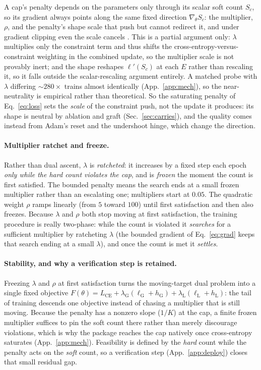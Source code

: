 \documentclass[10pt]{article}
\begin{document}
A cap's penalty depends on the parameters only through its scalar soft count
$S_c$, so its gradient always points along the same fixed direction
$\nabla_\theta S_c$: the multiplier, $\rho$, and the penalty's shape scale
that push but cannot redirect it, and under gradient clipping even the scale
cancels \citep{pascanu2013difficulty}. This is a partial argument only:
$\lambda$ multiplies only the constraint term and thus shifts the
cross-entropy-versus-constraint weighting in the combined update, so the
multiplier scale is not provably inert; and the shape reshapes $\ell'(S_c)$
at each $E$ rather than rescaling it, so it falls outside the scalar-rescaling
argument entirely. A matched probe with $\lambda$ differing ${\sim}280\times$
trains almost identically (App.~\ref{app:mech}), so the near-neutrality is
empirical rather than theoretical. So the saturating penalty of
Eq.~\eqref{eq:loss} sets the \emph{scale} of the constraint push, not the
update it produces: its shape is neutral by ablation and graft
(Sec.~\ref{sec:carries}), and the quality comes instead from Adam's reset
and the undershoot hinge, which change the direction.

\paragraph{Multiplier ratchet and freeze.}
Rather than dual ascent, $\lambda$ is \emph{ratcheted}: it increases by a
fixed step each epoch \emph{only while the hard count violates the cap}, and
is \emph{frozen} the moment the count is first satisfied. The bounded
penalty means the search ends at a small frozen multiplier rather than an
escalating one; multipliers start at $0.05$. The quadratic weight $\rho$
ramps linearly (from $5$ toward $100$) until first satisfaction and then
also freezes. Because $\lambda$ and $\rho$ both stop moving at first
satisfaction, the training procedure is really two-phase: while the count
is violated it \emph{searches} for a sufficient multiplier by ratcheting
$\lambda$ (the bounded gradient of Eq.~\eqref{eq:grad} keeps that search
ending at a small $\lambda$), and once the count is met it \emph{settles}.

\paragraph{Stability, and why a verification step is retained.}
Freezing $\lambda$ and $\rho$ at first satisfaction turns the moving-target
dual problem into a single fixed objective
$F(\theta)=L_{\text{CE}}+\lambda_{\mathrm{G}}(\ell_{\mathrm{G}}{+}h_{\mathrm{G}})+\lambda_{\mathrm{L}}(\ell_{\mathrm{L}}{+}h_{\mathrm{L}})$:
the tail of training descends one objective instead of chasing a multiplier
that is still moving. Because the penalty has a nonzero slope ($1/K$) at the
cap, a finite frozen multiplier suffices to pin the soft count there rather
than merely discourage violations, which is why the package reaches the cap
natively once cross-entropy saturates (App.~\ref{app:mech}). Feasibility is
defined by the \emph{hard} count while the penalty acts on the \emph{soft}
count, so a verification step (App.~\ref{app:deploy}) closes that small
residual gap.
\end{document}
